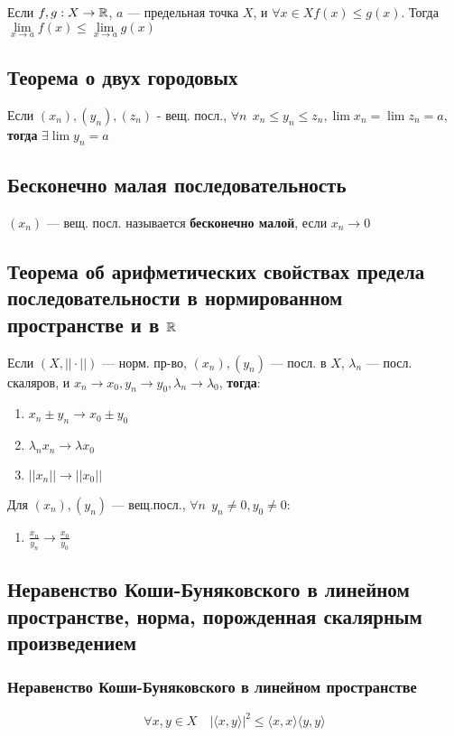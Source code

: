 Если $f, g:X\to \operatorname*{\mathbb{R}}$, $a$ --- предельная точка $X$, и $\forall x\in X f(x)\leq g(x)$. Тогда $\lim\limits_{x\to a}f(x)\leq \lim\limits_{x\to a}g(x)$ 

\subsection{Теорема о двух городовых}

Если $(x_n),(y_n),(z_n)$ - вещ. посл., $\forall n \ \ x_n\leq y_n\leq z_n, \lim x_n=\lim z_n =a$, \textbf{тогда} $\exists \lim y_n=a$

\subsection{Бесконечно малая последовательность}

$(x_n)$ --- вещ. посл. называется \textbf{бесконечно малой}, если $x_n\to 0$

\subsection{Теорема об арифметических свойствах предела последовательности в нормированном пространстве и в $\operatorname*{\mathbb{R}}$}

Если $(X, ||\cdot||)$ --- норм. пр-во, $(x_n),(y_n)$ --- посл. в $X$, $\lambda_n$ ---
посл. скаляров, и $x_n\to x_0, y_n\to y_0, \lambda_n\to \lambda_0$, \textbf{тогда}:
\begin{enumerate}
\item $x_n\pm y_n\to x_0\pm y_0$
\item $\lambda_nx_n\to \lambda x_0$
\item $||x_n||\to||x_0||$
\end{enumerate}

Для $(x_n),(y_n)$ 
--- вещ.посл., $\forall n \ \ y_n\not =0, y_0\not = 0$:
\begin{enumerate}[resume]
\item $\frac{x_n}{y_n}\to\frac{x_0}{y_0}$
\end{enumerate}

\subsection{Неравенство Коши-Буняковского в линейном пространстве, норма, порожденная скалярным произведением}

\subsubsection{Неравенство Коши-Буняковского в линейном пространстве}
$$\forall x,y\in X\quad |\langle x,y\rangle|^2\leq \langle x,x\rangle \langle y,y\rangle$$

